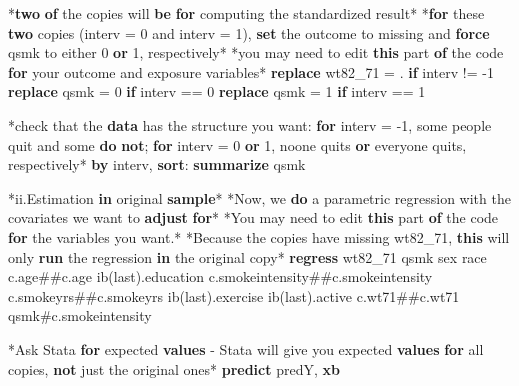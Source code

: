 \documentclass[
  10pt,
]{book}
\newenvironment{Shaded}{\begin{snugshade}}{\end{snugshade}}
\newcommand{\FunctionTok}[1]{\textcolor[rgb]{0.00,0.00,0.00}{#1}}
\newcommand{\KeywordTok}[1]{\textcolor[rgb]{0.13,0.29,0.53}{\textbf{#1}}}
\newcommand{\NormalTok}[1]{#1}
\newcommand{\OtherTok}[1]{\textcolor[rgb]{0.56,0.35,0.01}{#1}}
\begin{document}
\begin{Shaded}
\begin{Highlighting}[]
\NormalTok{*}\KeywordTok{two} \KeywordTok{of}\NormalTok{ the copies will }\KeywordTok{be} \KeywordTok{for}\NormalTok{ computing the standardized result*}
\NormalTok{*}\KeywordTok{for}\NormalTok{ these }\KeywordTok{two}\NormalTok{ copies (interv = 0 and interv = 1), }\KeywordTok{set}\NormalTok{ the outcome to }\FunctionTok{missing}\NormalTok{ and }\KeywordTok{force}\NormalTok{ qsmk to either 0 }\KeywordTok{or}\NormalTok{ 1, respectively*}
\NormalTok{*you may need to edit }\KeywordTok{this}\NormalTok{ part }\KeywordTok{of}\NormalTok{ the code }\KeywordTok{for}\NormalTok{ your outcome and exposure variables*}
\KeywordTok{replace}\NormalTok{ wt82\_71 = . }\KeywordTok{if}\NormalTok{ interv != {-}1}
\KeywordTok{replace}\NormalTok{ qsmk = 0 }\KeywordTok{if}\NormalTok{ interv == 0}
\KeywordTok{replace}\NormalTok{ qsmk = 1 }\KeywordTok{if}\NormalTok{ interv == 1}

\NormalTok{*check that the }\KeywordTok{data}\NormalTok{ has the structure you want: }\KeywordTok{for}\NormalTok{ interv = {-}1, some people quit and some }\KeywordTok{do} \KeywordTok{not}\NormalTok{; }\KeywordTok{for}\NormalTok{ interv = 0 }\KeywordTok{or}\NormalTok{ 1, noone quits }\KeywordTok{or}\NormalTok{ everyone quits, respectively*}
\KeywordTok{by}\NormalTok{ interv, }\KeywordTok{sort}\NormalTok{: }\KeywordTok{summarize}\NormalTok{ qsmk}

\NormalTok{*ii.Estimation }\KeywordTok{in}\NormalTok{ original }\KeywordTok{sample}\NormalTok{*}
\NormalTok{*Now, we }\KeywordTok{do}\NormalTok{ a parametric regression with the covariates we want to }\KeywordTok{adjust} \KeywordTok{for}\NormalTok{*}
\NormalTok{*You may need to edit }\KeywordTok{this}\NormalTok{ part }\KeywordTok{of}\NormalTok{ the code }\KeywordTok{for}\NormalTok{ the variables you want.*}
\NormalTok{*Because the copies have }\FunctionTok{missing}\NormalTok{ wt82\_71, }\KeywordTok{this}\NormalTok{ will only }\KeywordTok{run}\NormalTok{ the regression }\KeywordTok{in}\NormalTok{ the original copy*}
\KeywordTok{regress}\NormalTok{ wt82\_71 qsmk sex race c.age\#\#c.age ib(}\FunctionTok{last}\NormalTok{).education c.smokeintensity\#\#c.smokeintensity c.smokeyrs\#\#c.smokeyrs ib(}\FunctionTok{last}\NormalTok{).exercise ib(}\FunctionTok{last}\NormalTok{).active c.wt71\#\#c.wt71 qsmk\#c.smokeintensity}

\NormalTok{*Ask Stata }\KeywordTok{for}\NormalTok{ expected }\KeywordTok{values}\NormalTok{ {-} Stata will give you expected }\KeywordTok{values} \KeywordTok{for} \OtherTok{all}\NormalTok{ copies, }\KeywordTok{not}\NormalTok{ just the original ones*}
\KeywordTok{predict}\NormalTok{ predY, }\KeywordTok{xb}


\end{Highlighting}
\end{Shaded}
\end{document}
